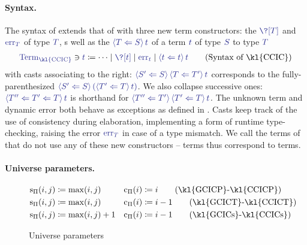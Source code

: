 \paragraph{Syntax.}
The syntax of %
extends that of 
with three new term constructors: the  $\tcol{\?[T]}$ and
 $\tcol{\err[T]}$ of type $\tcol{T}$, 
s well as the  $\tcol{\cast{S}{T}{t}}$
of a term $\tcol{t}$ of type $\tcol{S}$ to type $\tcol{T}$
%
\begin{align}
  \label{fig:syntax-castcic}
  \tcol{\terms{\kl{CCIC}}} \ni \tcol{t} \coloneqq \dots \mid \tcol{\?[t]} \mid \tcol{\err[t]} \mid \tcol{\cast{t}{t}{t}} \tag{Syntax of \kl{CCIC}}
\end{align}
%
with casts associating to the right:
$\tcol{\cast{S}{S'}{\cast{T'}{T}{t}}}$ corresponds to the fully-parenthesized
$\tcol{\cast{S}{S'}{\left(\cast{T}{T'}{t}\right)}}$.
We also collapse successive ones:
$\tcol{\cast{T}{T'' \Leftarrow T'}{t}}$ is shorthand for
$\tcol{\cast{T'}{T''}{\cast{T}{T'}{t}}}$.
The unknown term and dynamic error both behave as exceptions as
defined in  .
%
Casts keep track of the use of consistency during elaboration, implementing
a form of runtime type-checking, raising the error $\tcol{\err[T]}$ in case of a type mismatch.
%
We call  the terms of  that do not use any of these new
constructors –   terms thus correspond to  terms.

\paragraph{Universe parameters.}

\begin{figure}
\begin{align}
\sortOfPi{i}{j} &\coloneqq \max(i,j) &  \castOfPi{i} &\coloneqq i \label{eq:spi-cpi-gcicp}\tag{\text{\kl{GCICP}-\kl{CCICP}}}\\
\sortOfPi{i}{j} &\coloneqq \max(i,j) & \castOfPi{i} &\coloneqq i-1 \label{eq:spi-cpi-gcict}\tag{\text{\kl{GCICT}-\kl{CCICT}}}\\
\sortOfPi{i}{j} &\coloneqq \max(i,j)+1 &  \castOfPi{i} &\coloneqq i-1 \label{eq:spi-cpi-gcics}\tag{\text{\kl{GCICs}-\kl{CCICs}}}
\end{align}
	\caption{Universe parameters}
	\label{fig:univ-param}
\end{figure}

